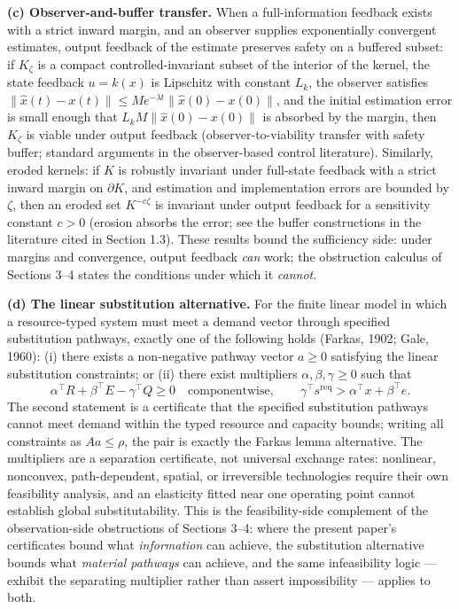 \documentclass[11pt]{article}
\theoremstyle{definition}
\begin{document}
\textbf{(c) Observer-and-buffer transfer.} When a full-information
feedback exists with a strict inward margin, and an observer supplies
exponentially convergent estimates, output feedback of the estimate
preserves safety on a buffered subset: if \(K_\zeta\) is a compact controlled-invariant subset of the interior of the kernel, the state
feedback \(u = k(x)\) is Lipschitz with constant \(L_k\), the observer satisfies \(\|\hat x(t) - x(t)\| \le M e^{-\lambda t}\|\hat x(0) - x(0)\|\), and
the initial estimation error is small enough that
\(L_k M \|\hat x(0) - x(0)\|\) is absorbed by the margin, then \(K_\zeta\) is viable under output feedback (observer-to-viability
transfer with safety buffer; standard arguments in the observer-based
control literature). Similarly, eroded kernels: if \(K\) is robustly
invariant under full-state feedback with a strict inward margin on
\(\partial K\), and estimation and implementation errors are bounded by \(\zeta\), then an eroded set \(K^{-c\zeta}\) is invariant
under output feedback for a sensitivity constant \(c > 0\) (erosion
absorbs the error; see the buffer constructions in the literature cited in Section 1.3). These results bound the sufficiency side: under margins and convergence, output feedback \emph{can} work; the obstruction calculus
of Sections 3--4 states the conditions under which it \emph{cannot}.

\textbf{(d) The linear substitution alternative.} For the finite linear
model in which a resource-typed system must meet a demand vector through specified substitution pathways, exactly one of the following holds
(Farkas, 1902; Gale, 1960): (i) there exists a non-negative pathway
vector \(a \ge 0\) satisfying the linear substitution constraints; or
(ii) there exist multipliers \(\alpha, \beta, \gamma \ge 0\) such that
\[\alpha^\top R + \beta^\top E - \gamma^\top Q \ge 0 \quad\text{componentwise},\qquad \gamma^\top s^{\mathrm{req}} > \alpha^\top x + \beta^\top e.\]
The second statement is a certificate that the specified substitution pathways cannot meet demand within the typed resource and capacity
bounds; writing all constraints as \(Aa \le \rho\), the pair is exactly
the Farkas lemma alternative. The multipliers are a separation
certificate, not universal exchange rates: nonlinear, nonconvex,
path-dependent, spatial, or irreversible technologies require their own
feasibility analysis, and an elasticity fitted near one operating point
cannot establish global substitutability. This is the feasibility-side
complement of the observation-side obstructions of Sections 3--4: where
the present paper's certificates bound what \emph{information} can
achieve, the substitution alternative bounds what \emph{material
pathways} can achieve, and the same infeasibility logic --- exhibit the separating multiplier rather than assert impossibility --- applies to both.
\end{document}
